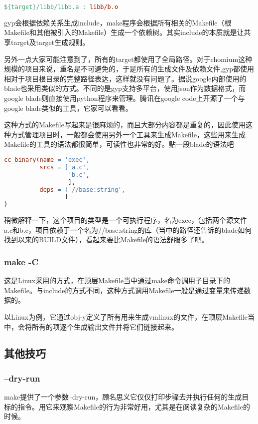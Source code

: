 \begin{lstlisting}[language=make]
${target}/libb/libb.a : libb/b.o
\end{lstlisting}
gyp会根据依赖关系生成include，make程序会根据所有相关的Makefile（根Makefile和其他被引入的Makefile）生成一个依赖树。其实include的本质就是让共享target及target生成规则。

另外一点大家可能注意到了，所有的target都使用了全局路径。对于chomium这种规模的项目来说，重名是不可避免的，于是所有的生成文件及依赖文件,gyp都使用相对于项目根目录的完整路径表达，这样就没有问题了。据说google内部使用的blade也采用类似的方式。不同的是gyp支持多平台，使用json作为数据格式，而google blade则直接使用python程序来管理。腾讯在google code上开源了一个与google blade类似的工具，它家可以看看。

这种方式的Makefile写起来是很麻烦的，而且大部分内容都是重复的，因此使用这种方式管理项目时，一般都会使用另外一个工具来生成Makefile，这些用来生成Makefile的工具的语法都很简单，可读性也非常的好。贴一段blade的语法吧

\begin{lstlisting}[language=make]
cc_binary(name = 'exec',
          srcs = ['a.c',
                  'b.c',
                  ],
          deps = ['//base:string',
                 ]
)
\end{lstlisting}
稍微解释一下，这个项目的类型是一个可执行程序，名为exec，包括两个源文件a.c和b.c，项目依赖于一个名为//base:string的库（当中的路径还告诉的blade如何找到以来的BUILD文件），看起来要比Makefile的语法舒服多了吧。

\subsubsection{make -C }
这是Linux采用的方式，在顶层Makefile当中通过make命令调用子目录下的Makefile。与include的方式不同，这种方式调用Makefile一般是通过变量来传递数据的。

以Linux为例，它通过obj-y定义了所有用来生成vmlinux的文件，在顶层Makefile当中，会将所有的项逐个生成输出文件并将它们链接起来。


\subsection{其他技巧}
\subsubsection{--dry-run}
make提供了一个参数--dry-run，顾名思义它仅仅打印步骤去并执行任何的生成目标的指令。用它来观察Makefile的行为非常好用，尤其是在阅读复杂的Makefile的时候。

